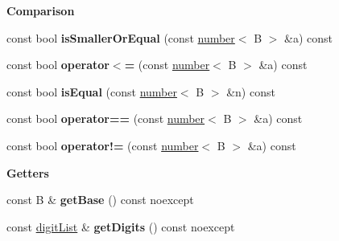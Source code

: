 \begin{Indent}{\bf Comparison}
\begin{DoxyCompactItemize}
\item 
\hypertarget{classcjr_1_1number_a5933f01885bea73d89cf31cc45e61d23}{const bool {\bfseries is\-Smaller\-Or\-Equal} (const \hyperlink{classcjr_1_1number}{number}$<$ B $>$ \&a) const }\label{classcjr_1_1number_a5933f01885bea73d89cf31cc45e61d23}

\item 
\hypertarget{classcjr_1_1number_a7bd4110bfd0fa3b74d1c8f39bc85f2a0}{const bool {\bfseries operator$<$=} (const \hyperlink{classcjr_1_1number}{number}$<$ B $>$ \&a) const }\label{classcjr_1_1number_a7bd4110bfd0fa3b74d1c8f39bc85f2a0}

\item 
\hypertarget{classcjr_1_1number_ae8f6c4c30da9add29b202ba0fdd280ba}{const bool {\bfseries is\-Equal} (const \hyperlink{classcjr_1_1number}{number}$<$ B $>$ \&n) const }\label{classcjr_1_1number_ae8f6c4c30da9add29b202ba0fdd280ba}

\item 
\hypertarget{classcjr_1_1number_a3ee573ccdf8c28f9c6dafa15572c27c9}{const bool {\bfseries operator==} (const \hyperlink{classcjr_1_1number}{number}$<$ B $>$ \&a) const }\label{classcjr_1_1number_a3ee573ccdf8c28f9c6dafa15572c27c9}

\item 
\hypertarget{classcjr_1_1number_aae51bdc811ee8199d5283ab4bbac32b6}{const bool {\bfseries operator!=} (const \hyperlink{classcjr_1_1number}{number}$<$ B $>$ \&a) const }\label{classcjr_1_1number_aae51bdc811ee8199d5283ab4bbac32b6}

\end{DoxyCompactItemize}
\end{Indent}
\begin{Indent}{\bf Getters}\par
\begin{DoxyCompactItemize}
\item 
\hypertarget{classcjr_1_1number_a433504c68497185d691540b631888884}{const B \& {\bfseries get\-Base} () const noexcept}\label{classcjr_1_1number_a433504c68497185d691540b631888884}

\item 
\hypertarget{classcjr_1_1number_a82f2f33ee7549ea6ca2c530dced42b23}{const \hyperlink{classcjr_1_1number_a64ca3e7862f3f4940065b93d38c1a465}{digit\-List} \& {\bfseries get\-Digits} () const noexcept}\label{classcjr_1_1number_a82f2f33ee7549ea6ca2c530dced42b23}

\end{DoxyCompactItemize}
\end{Indent}
